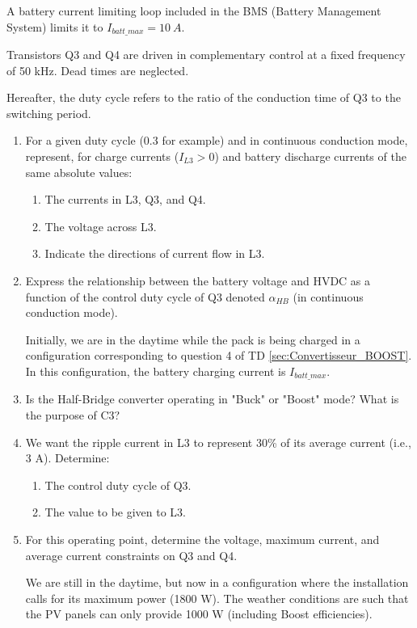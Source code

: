 A battery current limiting loop included in the BMS (Battery Management System) limits it to $I_{batt\_max} = 10\ A$.

Transistors Q3 and Q4 are driven in complementary control at a fixed frequency of 50 kHz. Dead times are neglected.

Hereafter, the duty cycle refers to the ratio of the conduction time of Q3 to the switching period.

\begin{enumerate}
\item For a given duty cycle (0.3 for example) and in continuous conduction mode, represent, for charge currents ($I_{L3} > 0$) and battery discharge currents of the same absolute values:
\begin{enumerate}
\item The currents in L3, Q3, and Q4.
\item The voltage across L3.
\item Indicate the directions of current flow in L3.
\end{enumerate}

\item Express the relationship between the battery voltage and HVDC as a function of the control duty cycle of Q3 denoted $\alpha_{HB}$ (in continuous conduction mode).

Initially, we are in the daytime while the pack is being charged in a configuration corresponding to question 4 of TD \ref{sec:Convertisseur_BOOST}. In this configuration, the battery charging current is $I_{batt\_max}$.

\item Is the Half-Bridge converter operating in "Buck" or "Boost" mode? What is the purpose of C3?

\item We want the ripple current in L3 to represent 30\% of its average current (i.e., 3 A). Determine:
\begin{enumerate}
\item The control duty cycle of Q3.
\item The value to be given to L3.
\end{enumerate}

\item For this operating point, determine the voltage, maximum current, and average current constraints on Q3 and Q4.

We are still in the daytime, but now in a configuration where the installation calls for its maximum power (1800 W). The weather conditions are such that the PV panels can only provide 1000 W (including Boost efficiencies).


\end{enumerate}
